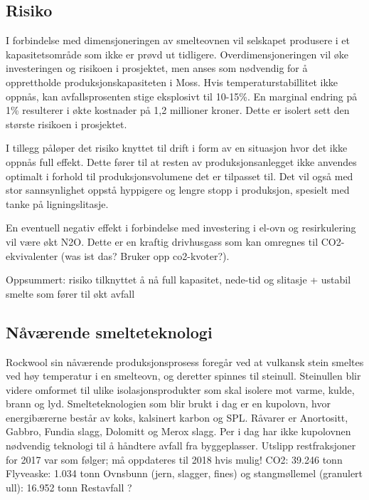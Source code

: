 \subsection*{Risiko}
I forbindelse med dimensjoneringen av smelteovnen vil selskapet produsere i et kapasitetsområde som ikke er prøvd ut tidligere. Overdimensjoneringen vil øke investeringen og risikoen i prosjektet, men anses som nødvendig for å opprettholde produksjonskapasiteten i Moss. Hvis temperaturstabillitet ikke oppnås, kan avfallsprosenten stige eksplosivt til 10-15\%. En marginal endring på 1\% resulterer i økte kostnader på 1,2 millioner kroner. Dette er isolert sett den største risikoen i prosjektet.

\indent \newline
I tillegg påløper det risiko knyttet til drift i form av en situasjon hvor det ikke oppnås full effekt. Dette fører til at resten av produksjonsanlegget ikke anvendes optimalt i forhold til produksjonsvolumene det er tilpasset til. Det vil også med stor sannsynlighet oppstå hyppigere og lengre stopp i produksjon, spesielt med tanke på ligningslitasje. 

\indent \newline
En eventuell negativ effekt i forbindelse med investering i el-ovn og resirkulering vil være økt N2O. Dette er en kraftig drivhusgass som kan omregnes til CO2-ekvivalenter (was ist das? Bruker opp co2-kvoter?). 

\indent \newline
Oppsummert: risiko tilknyttet å nå full kapasitet, nede-tid og slitasje + ustabil smelte som fører til økt avfall

\subsection{Nåværende smelteteknologi}
Rockwool sin nåværende produksjonsprosess foregår ved at vulkansk stein smeltes ved høy temperatur i en smelteovn, og deretter spinnes til steinull. Steinullen blir videre omformet til ulike isolasjonsprodukter som skal isolere mot varme, kulde, brann og lyd. Smelteteknologien som blir brukt i dag er en kupolovn, hvor energibærerne består av koks, kalsinert karbon og SPL. Råvarer er Anortositt, Gabbro, Fundia slagg, Dolomitt og Merox slagg. Per i dag har ikke kupolovnen nødvendig teknologi til å håndtere avfall fra byggeplasser.
\indent \newline
Utslipp restfraksjoner for 2017 var som følger; må oppdateres til 2018 hvis mulig!
CO2: 39.246 tonn
Flyveaske: 1.034 tonn
Ovnsbunn (jern, slagger, fines) og stangmøllemel (granulert ull): 16.952 tonn
Restavfall ?

